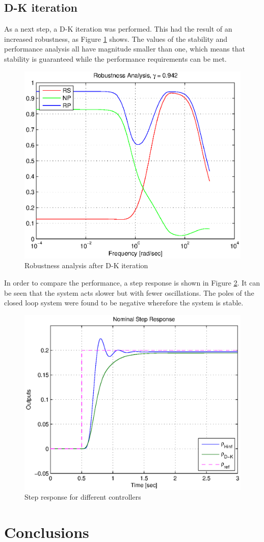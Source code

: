 \documentclass[conference]{IEEEtran}
\begin{document}
\subsection{D-K iteration}

As a next step, a D-K iteration was performed. This had the result of an increased robustness, as Figure \ref{figure:RP_after_DK} shows. The values of the stability and performance analysis all have magnitude smaller than one, which means that stability is guaranteed while the performance requirements can be met.

\begin{figure}[h]
\centering
  \includegraphics[width=.47\textwidth]{pics/RP_after_DK} 
  \caption{Robustness analysis after D-K iteration}  
  \label{figure:RP_after_DK}
\end{figure}

In order to compare the performance, a step response is shown in Figure \ref{figure:step_comp_02}. It can be seen that the system acts slower but with fewer oscillations. The poles of the closed loop system were found to be negative wherefore the system is stable.


\begin{figure}[h]
\centering
  \includegraphics[width=.47\textwidth]{pics/step_comp_02} 
  \caption{Step response for different controllers}  
  \label{figure:step_comp_02}
\end{figure}


\section{Conclusions}
\end{document}
